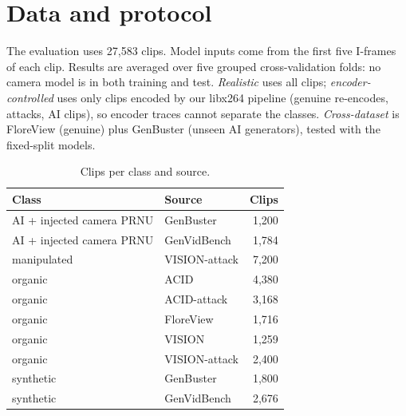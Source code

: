 \documentclass[11pt,a4paper]{article}
\begin{document}
\section{Data and protocol}
The evaluation uses 27,583 clips. Model inputs come from the first five I-frames of each clip. Results are averaged over five grouped cross-validation folds: no camera model is in both training and test. \emph{Realistic} uses all clips; \emph{encoder-controlled} uses only clips encoded by our libx264 pipeline (genuine re-encodes, attacks, AI clips), so encoder traces cannot separate the classes. \emph{Cross-dataset} is FloreView (genuine) plus GenBuster (unseen AI generators), tested with the fixed-split models.
\begin{table}[H]\centering\small\caption{Clips per class and source.}\begin{tabular}{llr}\toprule Class & Source & Clips \\\midrule
AI + injected camera PRNU & GenBuster & 1,200 \\
AI + injected camera PRNU & GenVidBench & 1,784 \\
manipulated & VISION-attack & 7,200 \\
organic & ACID & 4,380 \\
organic & ACID-attack & 3,168 \\
organic & FloreView & 1,716 \\
organic & VISION & 1,259 \\
organic & VISION-attack & 2,400 \\
synthetic & GenBuster & 1,800 \\
synthetic & GenVidBench & 2,676 \\
\bottomrule\end{tabular}\end{table}
\end{document}
